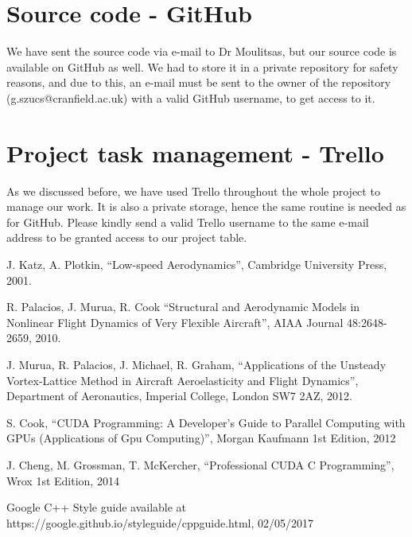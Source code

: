 \documentclass[a4paper, 11pt, article]{report}
\begin{document}
\section{Source code - GitHub}

We have sent the source code via e-mail to Dr Moulitsas, but our source code is available on GitHub as well. We had to store it in a private repository for safety reasons, and due to this, an e-mail must be sent to the owner of the repository (g.szucs@cranfield.ac.uk) with a valid GitHub username, to get access to it. 

\section{Project task management - Trello}

As we discussed before, we have used Trello throughout the whole project to manage our work. It is also a private storage, hence the same routine is needed as for GitHub. Please kindly send a valid Trello username to the same e-mail address to be granted access to our project table. 


\begingroup
\renewcommand{\section}[2]{}%
\begin{thebibliography}{1}

 J. Katz, A. Plotkin, “Low-speed Aerodynamics”, Cambridge University Press, 2001.

 R. Palacios, J. Murua, R. Cook “Structural and Aerodynamic Models in Nonlinear Flight Dynamics of Very Flexible Aircraft”, AIAA Journal 48:2648-2659, 2010.

 J. Murua, R. Palacios, J. Michael, R. Graham, “Applications of the Unsteady Vortex-Lattice Method in Aircraft Aeroelasticity and Flight Dynamics”, Department of Aeronautics, Imperial College, London SW7 2AZ, 2012.

 S. Cook, “CUDA Programming: A Developer's Guide to Parallel Computing with GPUs (Applications of Gpu Computing)”, Morgan Kaufmann 1st Edition, 2012

 J. Cheng, M. Grossman, T. McKercher, “Professional CUDA C Programming”, Wrox 1st Edition, 2014

 Google C++ Style guide available at https://google.github.io/styleguide/cppguide.html, 02/05/2017

\end{thebibliography}
\endgroup
   
\end{document}
